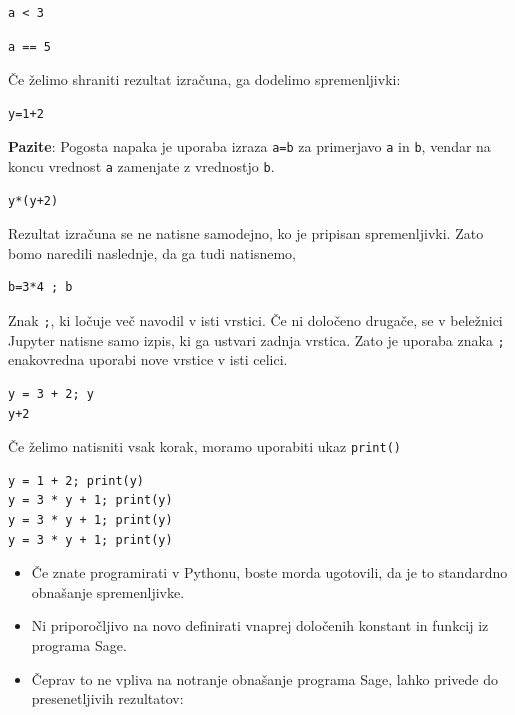 \begin{verbatim}
a < 3
\end{verbatim}

\begin{verbatim}
a == 5
\end{verbatim}

Če želimo shraniti rezultat izračuna, ga dodelimo spremenljivki:

\begin{verbatim}
y=1+2
\end{verbatim}

\textbf{Pazite}: Pogosta napaka je uporaba izraza \texttt{a=b} za primerjavo \texttt{a} in \texttt{b}, vendar na koncu vrednost \texttt{a} zamenjate z vrednostjo \texttt{b}.

\begin{verbatim}
y*(y+2)
\end{verbatim}

Rezultat izračuna se ne natisne samodejno, ko je pripisan spremenljivki.
Zato bomo naredili naslednje, da ga tudi natisnemo,

\begin{verbatim}
b=3*4 ; b
\end{verbatim}

Znak \texttt{;}, ki ločuje več navodil v isti vrstici.
Če ni določeno drugače, se v beležnici Jupyter natisne samo izpis, ki ga ustvari zadnja vrstica. Zato je uporaba znaka \texttt{;} enakovredna uporabi nove vrstice v isti celici.

\begin{verbatim}
y = 3 + 2; y
y+2
\end{verbatim}

Če želimo natisniti vsak korak, moramo uporabiti ukaz \texttt{print()}

\begin{verbatim}
y = 1 + 2; print(y)
y = 3 * y + 1; print(y)
y = 3 * y + 1; print(y)
y = 3 * y + 1; print(y)
\end{verbatim}

\begin{itemize}
\item Če znate programirati v Pythonu, boste morda ugotovili, da je to standardno obnašanje spremenljivke.
\end{itemize}

\begin{itemize}
\item Ni priporočljivo na novo definirati vnaprej določenih konstant in funkcij iz programa Sage.
\item Čeprav to ne vpliva na notranje obnašanje programa Sage, lahko privede do presenetljivih rezultatov:
\end{itemize}

